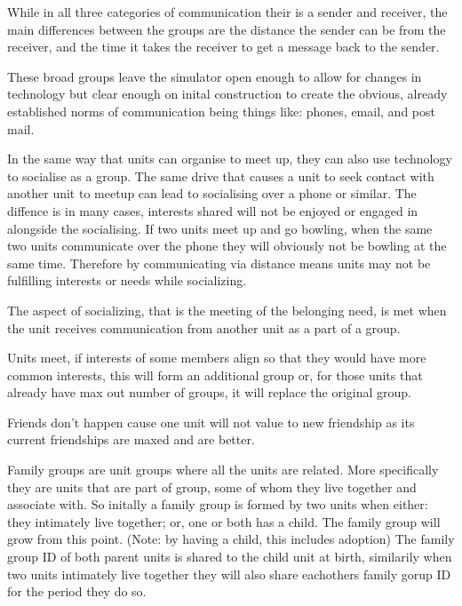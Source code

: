 While in all three categories of communication their is a sender and receiver, the main differences between the groups are the distance the sender can be from the receiver, and the time it takes the receiver to get a message back to the sender. 

These broad groups leave the simulator open enough to allow for changes in technology but clear enough on inital construction to create the obvious, already established norms of communication being things like: phones, email, and post mail.



In the same way that units can organise to meet up, they can also use technology to socialise as a group. The same drive that causes a unit to seek contact with another unit to meetup can lead to socialising over a phone or similar. The diffence is in many cases, interests shared will not be enjoyed or engaged in alongside the socialising. If two units meet up and go bowling, when the same two units communicate over the phone they will obviously not be bowling at the same time. Therefore by communicating via distance means units may not be fulfilling interests or needs while socializing.  

The aspect of socializing, that is the meeting of the belonging need, is met when the unit receives communication from another unit as a part of a group. 


Units meet, if interests of some members align so that they would have more common interests, this will form an additional group or, for those units that already have max out number of groups, it will replace the original group.


Friends don't happen cause one unit will not value to new friendship as its current friendships are maxed and are better.




Family groups are unit groups where all the units are related. More specifically they are units that are part of group, some of whom they live together and associate with. So initally a family group is formed by two units when either: they intimately live together; or, one or both has a child. The family group will grow from this point. (Note: by having a child, this includes adoption) The family group ID of both parent units is shared to the child unit at birth, similarily when two units intimately live together they will also share eachothers family gorup ID for the period they do so.

